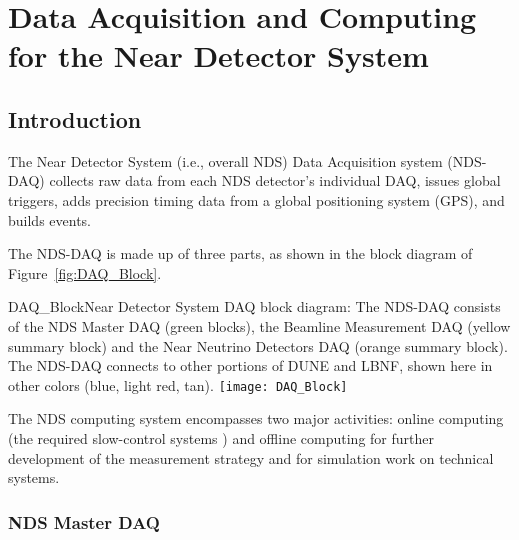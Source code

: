 \chapter{Data Acquisition and Computing for the Near Detector System} %
\label{ch:nd-gdaq}

\section{Introduction}
\label{sec:nd-gdaq-intro}

The Near Detector System (i.e., overall NDS) Data Acquisition system (NDS-DAQ) collects raw data from each NDS detector's
individual DAQ, %
issues global  triggers, adds precision timing 
data from a global positioning system (GPS), and builds events. %

The NDS-DAQ is made up of three parts, as shown in the block diagram of 
Figure~\ref{fig:DAQ_Block}.

\begin{cdrfigure}{DAQ_Block}{Near Detector System DAQ block diagram: The NDS-DAQ consists 
of the NDS Master DAQ (green blocks), the Beamline Measurement DAQ (yellow summary 
block) and the Near Neutrino Detectors DAQ (orange summary block).  The 
NDS-DAQ connects to other portions of DUNE and LBNF, shown here in other colors (blue, 
light red, tan).}
\texttt{[image: DAQ\_Block]}
\end{cdrfigure}


The NDS computing system encompasses two major activities: online computing (the required
slow-control systems ) and offline computing for further development of the measurement 
strategy and for simulation work on technical systems. 

\subsection{NDS Master DAQ} %
\label{sec:nd-master-daq}

